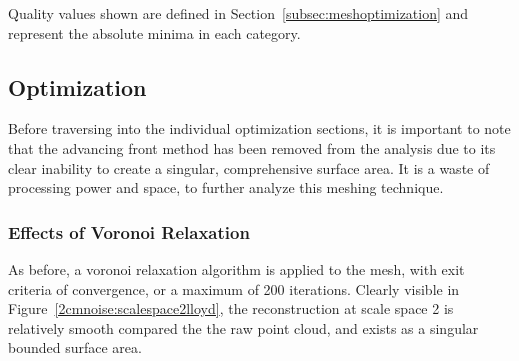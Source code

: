 \documentclass[12pt]{drexelthesis}
\let\Oldsubsection\subsection
\renewcommand{\subsection}{\FloatBarrier\Oldsubsection}
\let\Oldsubsubsection\subsubsection
\renewcommand{\subsubsection}{\FloatBarrier\Oldsubsubsection}
\begin{document}
\begin{table}[!ht]
	\centering
		\caption[Two centimeter noise induced initial mesh quality]{Initial quality analysis of simulated 2 centimeter noise surface mesh.}
	Quality values shown are defined in Section~\ref{subsec:meshoptimization} and represent the absolute minima in each category.
	\label{table:2cmnoiseInit}
\end{table}



\subsection{Optimization}

Before traversing into the individual optimization sections, it is important to note that the advancing front method has been removed from the analysis due to its clear inability to create a singular, comprehensive surface area. It is a waste of processing power and space, to further analyze this meshing technique.

\subsubsection{Effects of Voronoi Relaxation}

As before, a voronoi relaxation algorithm is applied to the mesh, with exit criteria of convergence, or a maximum of 200 iterations. Clearly visible in Figure~\ref{2cmnoise:scalespace2lloyd}, the reconstruction at scale space 2 is relatively smooth compared the the raw point cloud, and exists as a singular bounded surface area.
\end{document}
